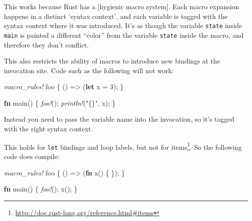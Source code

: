 \documentclass[a4paper,]{book}
\newenvironment{Shaded}{\begin{snugshade}}{\end{snugshade}}
\newcommand{\KeywordTok}[1]{\textcolor[rgb]{0.13,0.29,0.53}{\textbf{{#1}}}}
\newcommand{\DecValTok}[1]{\textcolor[rgb]{0.00,0.00,0.81}{{#1}}}
\newcommand{\StringTok}[1]{\textcolor[rgb]{0.31,0.60,0.02}{{#1}}}
\newcommand{\PreprocessorTok}[1]{\textcolor[rgb]{0.56,0.35,0.01}{\textit{{#1}}}}
\newcommand{\NormalTok}[1]{{#1}}
\renewcommand{\href}[2]{#2\footnote{\url{#1}}}
\begin{document}
This works because Rust has a {[}hygienic macro system{]}. Each macro
expansion happens in a distinct `syntax context', and each variable is
tagged with the syntax context where it was introduced. It's as though
the variable \texttt{state} inside \texttt{main} is painted a different
``color'' from the variable \texttt{state} inside the macro, and
therefore they don't conflict.

This also restricts the ability of macros to introduce new bindings at
the invocation site. Code such as the following will not work:

\begin{Shaded}
\begin{Highlighting}[]
\PreprocessorTok{macro_rules!} \NormalTok{foo \{}
    \NormalTok{() => (}\KeywordTok{let} \NormalTok{x = }\DecValTok{3}\NormalTok{);}
\NormalTok{\}}

\KeywordTok{fn} \NormalTok{main() \{}
    \PreprocessorTok{foo!}\NormalTok{();}
    \PreprocessorTok{println!}\NormalTok{(}\StringTok{"\{\}"}\NormalTok{, x);}
\NormalTok{\}}
\end{Highlighting}
\end{Shaded}

Instead you need to pass the variable name into the invocation, so it's
tagged with the right syntax context.

\begin{Shaded}
\end{Shaded}

This holds for \texttt{let} bindings and loop labels, but not for
\href{http://doc.rust-lang.org/reference.html\#items}{items}. So the
following code does compile:

\begin{Shaded}
\begin{Highlighting}[]
\PreprocessorTok{macro_rules!} \NormalTok{foo \{}
    \NormalTok{() => (}\KeywordTok{fn} \NormalTok{x() \{ \});}
\NormalTok{\}}

\KeywordTok{fn} \NormalTok{main() \{}
    \PreprocessorTok{foo!}\NormalTok{();}
    \NormalTok{x();}
\NormalTok{\}}
\end{Highlighting}
\end{Shaded}
\end{document}
